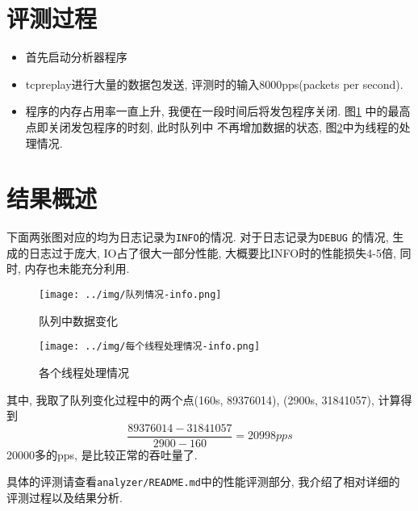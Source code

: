 \section{评测过程}

\begin{itemize}
    \item 首先启动分析器程序
    \item tcpreplay进行大量的数据包发送, 评测时的输入8000pps(packets per second).
    \item 程序的内存占用率一直上升, 我便在一段时间后将发包程序关闭.
        图\ref{fig:queue_pic} 中的最高点即关闭发包程序的时刻, 此时队列中
        不再增加数据的状态, 图\ref{fig:process_pic}中为线程的处理情况.
\end{itemize}

\section{结果概述}

 下面两张图对应的均为日志记录为\texttt{INFO}的情况. 对于日志记录为\texttt{DEBUG}
的情况, 生成的日志过于庞大, IO占了很大一部分性能, 大概要比INFO时的性能损失4-5倍,
同时, 内存也未能充分利用.

\begin{figure}[htbp!]
  \centering
  \texttt{[image: ../img/队列情况-info.png]}
  \caption{队列中数据变化}
  \label{fig:queue_pic}
\end{figure}

\begin{figure}[htbp!]
  \centering
  \texttt{[image: ../img/每个线程处理情况-info.png]}
  \caption{各个线程处理情况}
  \label{fig:process_pic}
\end{figure}

其中, 我取了队列变化过程中的两个点(160s, 89376014), (2900s, 31841057), 计算得到
$$ \frac{89376014 - 31841057}{2900 - 160} = 20998 pps $$
20000多的pps, 是比较正常的吞吐量了.


具体的评测请查看\texttt{analyzer/README.md}中的性能评测部分, 我介绍了相对详细的
评测过程以及结果分析.


